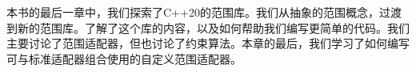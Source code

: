 本书的最后一章中，我们探索了C++20的范围库。我们从抽象的范围概念，过渡到新的范围库。了解了这个库的内容，以及如何帮助我们编写更简单的代码。我们主要讨论了范围适配器，但也讨论了约束算法。本章的最后，我们学习了如何编写可与标准适配器组合使用的自定义范围适配器。
